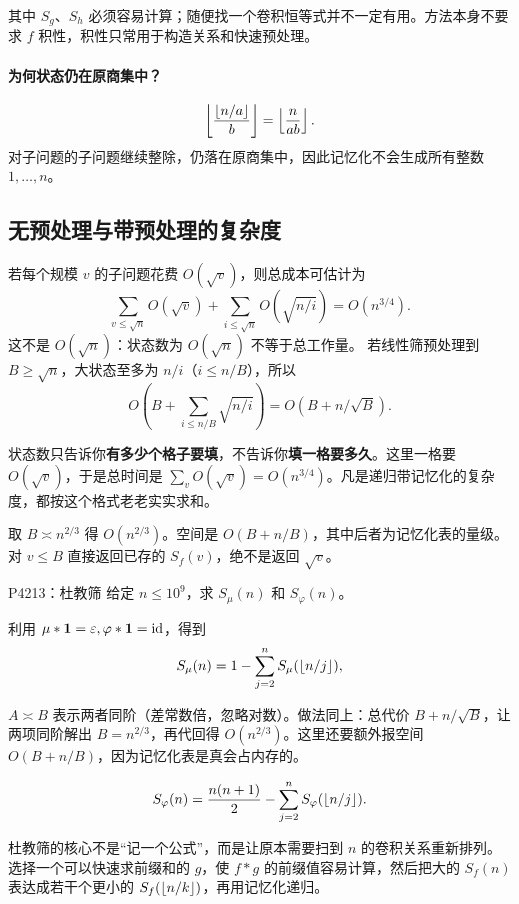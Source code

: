 其中 $S_g$、$S_h$ 必须容易计算；随便找一个卷积恒等式并不一定有用。方法本身不要求 $f$ 积性，积性只常用于构造关系和快速预处理。

\paragraph{为何状态仍在原商集中？}
\[
\left\lfloor \frac{\left\lfloor n/a\right\rfloor}b\right\rfloor=\left\lfloor \frac n{ab}\right\rfloor.
\]
对子问题的子问题继续整除，仍落在原商集中，因此记忆化不会生成所有整数 $1,\ldots,n$。

\subsection{无预处理与带预处理的复杂度}
若每个规模 $v$ 的子问题花费 $O(\sqrt v)$，则总成本可估计为
\[
 \sum_{v\le\sqrt n}O(\sqrt v)
 +\sum_{i\le\sqrt n}O(\sqrt{n/i})=O(n^{3/4}).
\]
这不是 $O(\sqrt n)$：状态数为 $O(\sqrt n)$ 不等于总工作量。
若线性筛预处理到 $B\ge\sqrt n$，大状态至多为 $n/i$（$i\le n/B$），所以
\[
 O\left(B+\sum_{i\le n/B}\sqrt{n/i}\right)
 =O(B+n/\sqrt B).
\]

\begin{tip}
状态数只告诉你\textbf{有多少个格子要填}，不告诉你\textbf{填一格要多久}。这里一格要 $O(\sqrt v)$，于是总时间是 $\sum_{v}O(\sqrt v)=O(n^{3/4})$。凡是递归带记忆化的复杂度，都按这个格式老老实实求和。
\end{tip}

取 $B\asymp n^{2/3}$ 得 $O(n^{2/3})$。空间是 $O(B+n/B)$，其中后者为记忆化表的量级。对 $v\le B$ 直接返回已存的 $S_f(v)$，绝不是返回 $\sqrt v$。


\begin{problem}{P4213：杜教筛}
给定 $n\le10^9$，求 $S_\mu(n)$ 和 $S_\varphi(n)$。
\end{problem}
利用 $\mu*\mathbf 1=\varepsilon,\varphi*\mathbf 1=\operatorname{id}$，得到
\[
 S_\mu(n)=1-\sum_{j=2}^n S_\mu(\left\lfloor n/j\right\rfloor),
\]

\begin{tip}
$A\asymp B$ 表示两者同阶（差常数倍，忽略对数）。做法同上：总代价 $B+n/\sqrt B$，让两项同阶解出 $B=n^{2/3}$，再代回得 $O(n^{2/3})$。这里还要额外报空间 $O(B+n/B)$，因为记忆化表是真会占内存的。
\end{tip}

\[
 S_\varphi(n)=\frac{n(n+1)}2-\sum_{j=2}^nS_\varphi(\left\lfloor n/j\right\rfloor).
\]

\begin{pitfall}[讲解：先看这题到底在做什么]
杜教筛的核心不是“记一个公式”，而是让原本需要扫到 $n$ 的卷积关系重新排列。选择一个可以快速求前缀和的 $g$，使 $f*g$ 的前缀值容易计算，然后把大的 $S_f(n)$ 表达成若干个更小的 $S_f(\left\lfloor n/k\right\rfloor)$，再用记忆化递归。
\end{pitfall}

